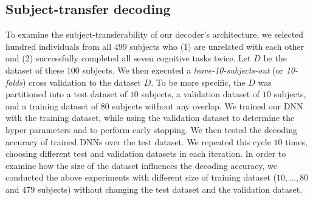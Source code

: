 \subsection{Subject-transfer decoding}
\label{sec:decoding_setting}
To examine the subject-transferability of our decoder's architecture, we selected hundred individuals from all $499$ subjects who (1) are unrelated with each other and (2) successfully completed all seven cognitive tasks twice.
Let $D$ be the dataset of these $100$ subjects.
We then executed a \textit{leave-10-subjects-out} (or \textit{10-folds}) cross validation to the dataset $D$.
%
To be more specific, the $D$ was partitioned into a test dataset of $10$ subjects, a validation dataset of $10$ subjects, and a training dataset of $80$ subjects without any overlap.
%
We trained our DNN with the training dataset, while using the validation dataset to determine the hyper parameters and to perform early stopping.
%
We then tested the decoding accuracy of trained DNNs over the test dataset.
%
We repeated this cycle $10$ times, choosing different test and validation datasets in each iteration.
%
In order to examine how the size of the dataset influences the decoding
accuracy, we conducted the above experiments with different size of
training dataset ($10, \dots, 80$ and $479$ subjects) without changing the test dataset and the validation dataset.

